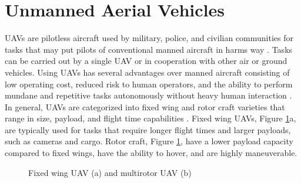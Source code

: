 \documentclass[numbered,pdftex]{ohio-etd}
\begin{document}
\section{Unmanned Aerial Vehicles}
UAVs are pilotless aircraft used by military, police, and civilian communities for tasks that may put pilots of conventional manned aircraft in harms way \cite{bone_uavs_2003}. Tasks can be carried out by a single UAV or in cooperation with other air \cite{oh_coordinated_2013,hyondong_oh_coordinated_2015,wise_uav_2006} or ground \cite{ulun_coordinated_2013} vehicles. Using UAVs has several advantages over manned aircraft consisting of low operating cost, reduced risk to human operators, and the ability to perform mundane and repetitive tasks autonomously without heavy human interaction \cite{austin2011unmanned}. In general, UAVs are categorized into fixed wing and rotor craft varieties that range in size, payload, and flight time capabilities \cite{beard_small_2012}. Fixed wing UAVs, Figure \ref{fig:fixedMultirotor}a, are typically used for tasks that require longer flight times and larger payloads, such as cameras and cargo. Rotor craft, Figure \ref{fig:fixedMultirotor}, have a lower payload capacity compared to fixed wings, have the ability to hover, and are highly maneuverable.
\begin{figure}[H]
	\begin{subfigmatrix}{2}%
		\centering	
		\hspace*{0mm}
	\end{subfigmatrix}
	\caption{Fixed wing UAV (a) and multirotor UAV (b)}
	\label{fig:fixedMultirotor}
\end{figure}
\end{document}
